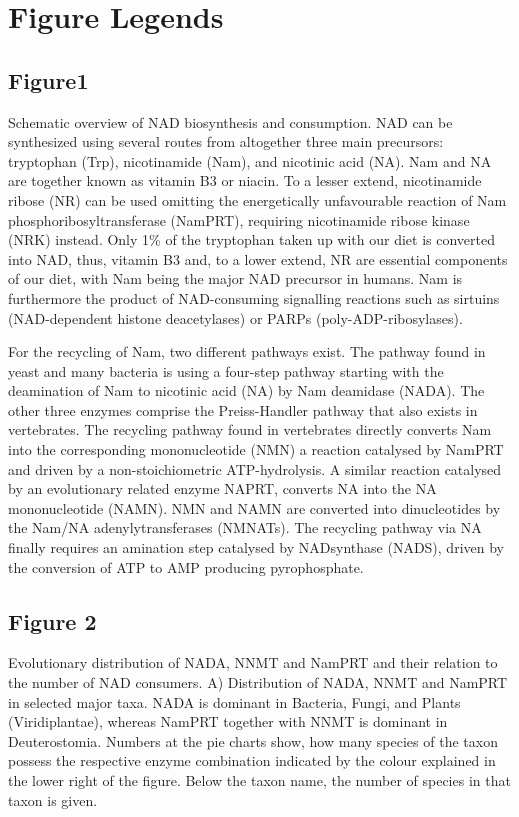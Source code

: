 
\section{Figure Legends}

\subsection{Figure1}

Schematic overview of NAD biosynthesis and consumption. NAD can be synthesized using several routes from altogether three main precursors: tryptophan (Trp), nicotinamide (Nam), and nicotinic acid (NA). Nam and NA are together known as vitamin B3 or niacin. To a lesser extend, nicotinamide ribose (NR) can be used omitting the energetically unfavourable reaction of Nam phosphoribosyltransferase (NamPRT), requiring nicotinamide ribose kinase (NRK) instead. Only 1\% of the tryptophan taken up with our diet is converted into NAD, thus, vitamin B3 and, to a lower extend, NR are essential components of our diet, with Nam being the major NAD precursor in humans. Nam is furthermore the product of NAD-consuming signalling reactions such as sirtuins (NAD-dependent histone deacetylases) or PARPs (poly-ADP-ribosylases).

For the recycling of Nam, two different pathways exist. The pathway found in yeast and many bacteria is using a four-step pathway starting with the deamination of Nam to nicotinic acid (NA) by Nam deamidase (NADA). The other three enzymes comprise the Preiss-Handler pathway that also exists in vertebrates. The recycling pathway found in vertebrates directly converts Nam into the corresponding mononucleotide (NMN) a reaction catalysed by NamPRT and driven by a non-stoichiometric ATP-hydrolysis. A similar reaction catalysed by an evolutionary related enzyme NAPRT, converts NA into the NA mononucleotide (NAMN). NMN and NAMN are converted into dinucleotides by the Nam/NA adenylytransferases (NMNATs). The recycling pathway via NA finally requires an amination step catalysed by NADsynthase (NADS), driven by the conversion of ATP to AMP producing pyrophosphate.


\subsection{Figure 2}

Evolutionary distribution of NADA, NNMT and NamPRT and their relation to the number of NAD consumers. A) Distribution of NADA, NNMT and NamPRT in selected major taxa. NADA is dominant in Bacteria, Fungi, and Plants (Viridiplantae), whereas NamPRT together with NNMT is dominant in Deuterostomia. Numbers at the pie charts show, how many species of the taxon possess the respective enzyme combination indicated by the colour explained in the lower right of the figure. Below the taxon name, the number of species in that taxon is given.


